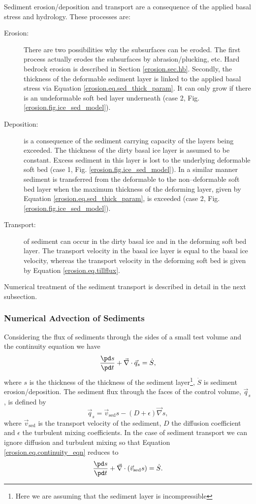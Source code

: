 Sediment erosion/deposition and transport are a consequence of the applied basal stress and hydrology. These processes are:
\begin{description}
\item[Erosion:] There are two possibilities why the subsurfaces can be eroded. The first process actually erodes the subsurfaces by abrasion/plucking, etc. Hard bedrock erosion is described in Section \ref{erosion.sec.hb}. Secondly, the thickness of the deformable sediment layer is linked to the applied basal stress via Equation \eqref{erosion.eq.sed_thick_param}. It can only grow if there is an undeformable soft bed layer underneath (case 2, Fig. \ref{erosion.fig.ice_sed_model}).
\item[Deposition:] is a consequence of the sediment carrying capacity of the layers being exceeded. The thickness of the dirty basal ice layer is assumed to be
constant. Excess sediment in this layer is lost to the underlying deformable soft bed (case 1, Fig. \ref{erosion.fig.ice_sed_model}). In a similar manner sediment is transferred from the deformable to the non--deformable soft bed layer when the maximum thickness of the deforming layer, given by Equation \eqref{erosion.eq.sed_thick_param}, is exceeded (case 2, Fig.\ref{erosion.fig.ice_sed_model}).
\item[Transport:] of sediment can occur in the dirty basal ice and in the deforming soft bed layer. The transport velocity in the basal ice layer is equal to the basal ice velocity, whereas the transport velocity in the deforming soft bed is given by Equation \eqref{erosion.eq.tillflux}.
\end{description}
Numerical treatment of the sediment transport is described in detail in the next subsection.

\subsubsection{Numerical Advection of Sediments}
Considering the flux of sediments through the sides of a small test volume and the continuity equation we have
\begin{equation}
  \label{erosion.eq.continuity_eqn}
  \frac{\pd s}{\pd t}+\vec\nabla\cdot\vec{q}_s=\dot{S},
\end{equation}
where $s$ is the thickness of the thickness of the sediment layer\footnote{Here we are assuming that the sediment layer is incompressible}, $\dot{S}$ is sediment erosion/deposition. The sediment flux through the faces of the control volume, $\vec{q}_s$, is defined by
\begin{equation}
  \vec{q}_s=\vec{v}_{\text{sed}}s-(D+\epsilon)\vec\nabla s,
\end{equation}
where $\vec{v}_{\text{sed}}$ is the transport velocity of the sediment, $D$ the diffusion coefficient and $\epsilon$ the turbulent mixing coefficients. In the case of sediment transport we can ignore diffusion and turbulent mixing so that Equation \eqref{erosion.eq.continuity_eqn} reduces to
\begin{equation}
  \label{erosion.eq.transport_eqn}
  \frac{\pd s}{\pd t}+\vec\nabla\cdot(\vec{v}_{\text{sed}}s)=\dot{S}.
\end{equation}

